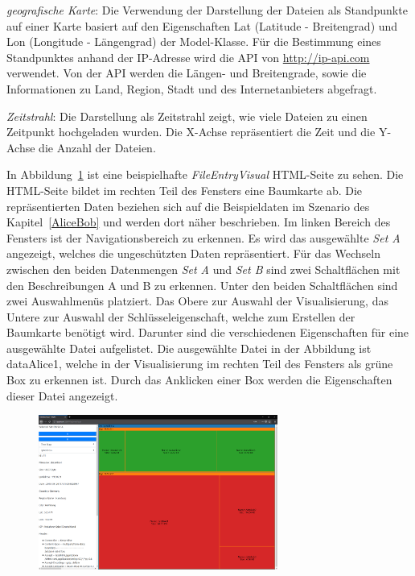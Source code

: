 \documentclass[
    fontsize=12pt,
    headings=small,
    parskip=half,           %
    bibliography=totoc,
    numbers=noenddot,       %
    open=any,               %
    ]{scrreprt}
\begin{document}
\textit{geografische Karte}: Die Verwendung der Darstellung der Dateien als Standpunkte auf einer Karte basiert auf den Eigenschaften Lat (Latitude - Breitengrad) und Lon (Longitude - Längengrad) der Model-Klasse.
Für die Bestimmung eines Standpunktes anhand der IP-Adresse wird die API von \url{http://ip-api.com} verwendet.
Von der API werden die Längen- und Breitengrade, sowie die Informationen zu Land, Region, Stadt und des Internetanbieters abgefragt.

\textit{Zeitstrahl}: Die Darstellung als Zeitstrahl zeigt, wie viele Dateien zu einen Zeitpunkt hochgeladen wurden.
Die X-Achse repräsentiert die Zeit und die Y-Achse die Anzahl der Dateien.

In Abbildung~\ref{fig:VisualPageAll} ist eine beispielhafte \textit{FileEntryVisual} HTML-Seite zu sehen.
Die HTML-Seite bildet im rechten Teil des Fensters eine Baumkarte ab.
Die repräsentierten Daten beziehen sich auf die Beispieldaten im Szenario des Kapitel~\ref{AliceBob} und werden dort näher beschrieben.
Im linken Bereich des Fensters ist der Navigationsbereich zu erkennen.
Es wird das ausgewählte \textit{Set A} angezeigt, welches die ungeschützten Daten repräsentiert.
Für das Wechseln zwischen den beiden Datenmengen \textit{Set A} und \textit{Set B} sind zwei Schaltflächen mit den Beschreibungen A und B zu erkennen.
Unter den beiden Schaltflächen sind zwei Auswahlmenüs platziert. 
Das Obere zur Auswahl der Visualisierung, das Untere zur Auswahl der Schlüsseleigenschaft, welche zum Erstellen der Baumkarte benötigt wird.
Darunter sind die verschiedenen Eigenschaften für eine ausgewählte Datei aufgelistet.
Die ausgewählte Datei in der Abbildung ist dataAlice1, welche in der Visualisierung im rechten Teil des Fensters als grüne Box zu erkennen ist.
Durch das Anklicken einer Box werden die Eigenschaften dieser Datei angezeigt.
\begin{figure}[H]
\includegraphics[width=0.7\textwidth]{../pic/VisualPageAll.png}
\label{fig:VisualPageAll}
\end{figure}
\end{document}
